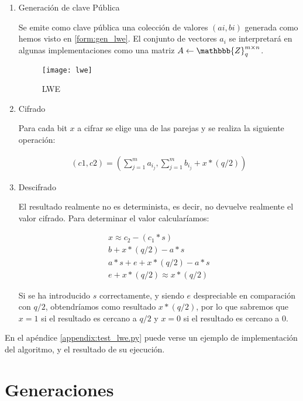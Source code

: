 \begin{enumerate}
  \item Generación de clave Pública

  Se emite como clave pública una colección de valores $(ai, bi)$ generada como hemos visto en \ref{form:gen_lwe}. El conjunto de vectores $a_i$ se interpretará en algunas implementaciones como una matriz $A \leftarrow \mathbbb{Z}_q^{m \times n}$.

    \begin{figure}[h]
      \caption{LWE \cite{halevi_homomorphic_2017}}
      \label{fig:lwe}
      \texttt{[image: lwe]}
    \end{figure}

  \item Cifrado

  Para cada bit $x$ a cifrar se elige una de las parejas y se realiza la siguiente operación:

    \begin{gather*}
        \label{form:cifrado_lwe}
        (c1, c2) = (\sum_{j=1}^{m} a_i_j, \sum_{j=1}^{m} b_i_j + x * (q/2))
    \end{gather*}

  \item Descifrado

  El resultado realmente no es determinista, es decir, no devuelve realmente el valor cifrado. Para determinar el valor calcularíamos:

    \begin{gather*}
        \label{form:descifrado_lwe}
        x \approx c_2 - (c_1*s) \\
        b + x*(q/2) - a*s \\
        a*s + e + x*(q/2) - a*s \\
        e + x*(q/2) \approx x * (q/2)
    \end{gather*}

  Si se ha introducido $s$ correctamente, y siendo $e$ despreciable en comparación con $ q/2 $, obtendríamos como resultado $ x * (q/2) $, por lo que sabremos que $ x = 1$ si el resultado es cercano a $ q/2 $ y  $ x = 0 $ si el resultado es cercano a $ 0 $.

\end{enumerate}

En el apéndice \ref{appendix:test_lwe.py} puede verse un ejemplo de implementación del algoritmo, y el resultado de su ejecución.

\section{Generaciones}

